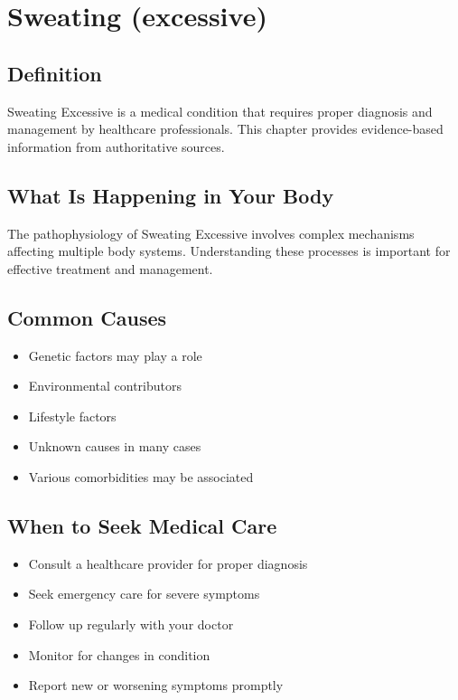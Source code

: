 
\chapter{Sweating (excessive)}

\section*{Definition}
Sweating Excessive is a medical condition that requires proper diagnosis and management by healthcare professionals. This chapter provides evidence-based information from authoritative sources.

\section*{What Is Happening in Your Body}
The pathophysiology of Sweating Excessive involves complex mechanisms affecting multiple body systems. Understanding these processes is important for effective treatment and management.

\section*{Common Causes}
\begin{itemize}
  \item Genetic factors may play a role
  \item Environmental contributors
  \item Lifestyle factors
  \item Unknown causes in many cases
  \item Various comorbidities may be associated
\end{itemize}

\section*{When to Seek Medical Care}
\begin{itemize}
  \item Consult a healthcare provider for proper diagnosis
  \item Seek emergency care for severe symptoms
  \item Follow up regularly with your doctor
  \item Monitor for changes in condition
  \item Report new or worsening symptoms promptly
\end{itemize}

